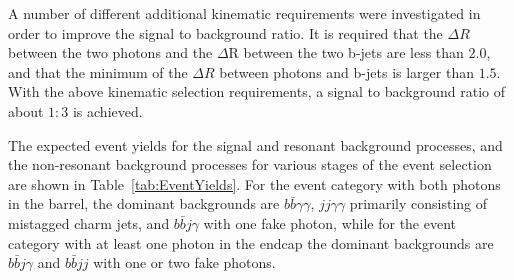 A number of different additional kinematic requirements were investigated in order to improve the signal to background ratio. It is required that the $\Delta R$ between the two photons and the $\Delta$R between the two b-jets are less than $2.0$, and that the minimum of the  $\Delta R$ between photons and b-jets is larger than $1.5$. With the above kinematic selection requirements, a signal to background ratio of about $1:3$ is achieved.

The expected event yields for the signal and resonant background processes, and the  non-resonant background processes for various stages of the event selection
are shown in Table~\ref{tab:EventYields}. For the event category with both photons in the barrel, the dominant backgrounds are $b\bar{b}\gamma\gamma$, $jj\gamma\gamma$ primarily consisting of mistagged charm jets, and $b\bar{b}j\gamma$ with one fake photon, while for the event category with at least one photon in the endcap the dominant backgrounds are $b\bar{b}j\gamma$ and $b\bar{b}jj$ with one or two fake photons.

